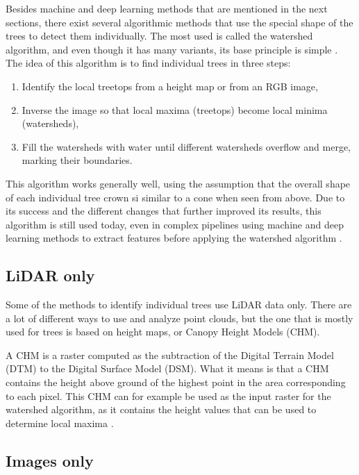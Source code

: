 \documentclass[
]{report}
\providecommand{\tightlist}{%
  \setlength{\itemsep}{0pt}\setlength{\parskip}{0pt}}\usepackage{longtable,booktabs,array}
\begin{document}
Besides machine and deep learning methods that are mentioned in the next
sections, there exist several algorithmic methods that use the special
shape of the trees to detect them individually. The most used is called
the watershed algorithm, and even though it has many variants, its base
principle is simple \autocite{watershed}. The idea of this algorithm is
to find individual trees in three steps:

\begin{enumerate}
\def\labelenumi{\arabic{enumi}.}
\tightlist
\item
  Identify the local treetops from a height map or from an RGB image,
\item
  Inverse the image so that local maxima (treetops) become local minima
  (watersheds),
\item
  Fill the watersheds with water until different watersheds overflow and
  merge, marking their boundaries.
\end{enumerate}

This algorithm works generally well, using the assumption that the
overall shape of each individual tree crown si similar to a cone when
seen from above. Due to its success and the different changes that
further improved its results, this algorithm is still used today, even
in complex pipelines using machine and deep learning methods to extract
features before applying the watershed algorithm
\autocite{Freudenberg2022,lidar_rgb_wst}.

\subsection{LiDAR only}\label{lidar-only}

Some of the methods to identify individual trees use LiDAR data only.
There are a lot of different ways to use and analyze point clouds, but
the one that is mostly used for trees is based on height maps, or Canopy
Height Models (CHM).

A CHM is a raster computed as the subtraction of the Digital Terrain
Model (DTM) to the Digital Surface Model (DSM). What it means is that a
CHM contains the height above ground of the highest point in the area
corresponding to each pixel. This CHM can for example be used as the
input raster for the watershed algorithm, as it contains the height
values that can be used to determine local maxima
\autocite{lidar_watershed}.

\subsection{Images only}\label{images-only}
\end{document}
